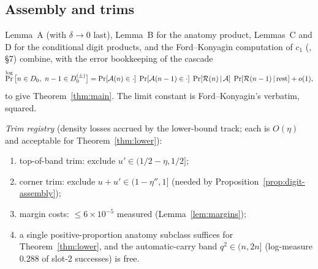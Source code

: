 \subsection{Assembly and trims}\label{subsec:assembly}

\begin{proposition}[assembly]\label{prop:assembly}
\statusN\quad
Lemma~A (with $\delta\to0$ last), Lemma~B for the anatomy product,
Lemmas~C and D for the conditional digit products, and the
Ford--Konyagin computation of $c_1$ (\cite{FK21}, \S7) combine, with the
error bookkeeping of the cascade
\[
\Pr^{\log}\big[n\in D_0,\ n-1\in D_0^{(\pm)}\big]
=\Pr[\mathcal A(n)\in\cdot]\;\Pr[\mathcal A(n-1)\in\cdot]
\;\Pr[\mathcal R(n)\,|\,\mathcal A]\;\Pr[\mathcal R(n-1)\,|\,\text{rest}]
+o(1),
\]
to give Theorem~\ref{thm:main}. The limit constant is Ford--Konyagin's
verbatim, squared.
\end{proposition}

\noindent\emph{Trim registry} (density losses accrued by the lower-bound
track; each is $O(\eta)$ and acceptable for Theorem~\ref{thm:lower}):
\begin{enumerate}
\item top-of-band trim: exclude $u'\in(1/2-\eta,1/2]$;
\item corner trim: exclude $u+u'\in(1-\eta'',1]$
(needed by Proposition~\ref{prop:digit-assembly});
\item margin costs: $\le6\times10^{-5}$ measured (Lemma~\ref{lem:margins});
\item a single positive-proportion anatomy subclass suffices for
Theorem~\ref{thm:lower}, and the automatic-carry band
$q^2\in(n,2n]$ (log-measure $0.288$ of slot-$2$ successes) is free.
\end{enumerate}
